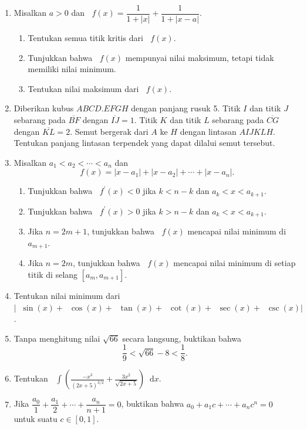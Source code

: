 \documentclass[12pt]{article}
\newcommand*\diff{\mathop{}\!\mathrm{d}}
\newcommand*\func[2]{\mathop{}\!{#1}{\left({#2}\right)}}
\newcommand*\ds[1]{\mathop{}\!\displaystyle{{#1}}}
\begin{document}
\begin{enumerate}[leftmargin=*]
\begin{enumerate}
		\end{enumerate}
		\item Misalkan $ a > 0 $ dan $ \func{f}{x} = \dfrac{1}{1 + \left|x\right|} + \dfrac{1}{1 + \left|x - a\right|} $.
		\begin{enumerate}
			\item Tentukan semua titik kritis dari $ \func{f}{x} $.
			\item Tunjukkan bahwa $ \func{f}{x} $ mempunyai nilai maksimum, tetapi tidak memiliki nilai minimum.
			\item Tentukan nilai maksimum dari $ \func{f}{x} $.
		\end{enumerate}
		\item Diberikan kubus $ ABCD.EFGH $ dengan panjang rusuk 5. Titik $ I $ dan titik $ J $ sebarang pada $ \overline{BF} $ dengan $ \overline{IJ} = 1 $. Titik $ K $ dan titik $ L $ sebarang pada $ \overline{CG} $ dengan $ \overline{KL} = 2 $. Semut bergerak dari $ A $ ke $ H $ dengan lintasan $ AIJKLH $. Tentukan panjang lintasan terpendek yang dapat dilalui semut tersebut.
		\item Misalkan $ a_{1} < a_{2} < \cdots < a_{n} $ dan
		\[ \func{f}{x} = \left|x - a_{1}\right| + \left|x - a_{2}\right| + \cdots + \left|x - a_{n}\right|. \]
		\begin{enumerate}
			\item Tunjukkan bahwa $ \func{f^{\prime}}{x} < 0 $ jika $ k < n - k $ dan $ a_{k} < x < a_{k + 1} $.
			\item Tunjukkan bahwa $ \func{f^{\prime}}{x} > 0 $ jika $ k > n - k $ dan $ a_{k} < x < a_{k + 1} $.
			\item Jika $ n = 2m + 1 $, tunjukkan bahwa $ \func{f}{x} $ mencapai nilai minimum di $ a_{m + 1} $.
			\item Jika $ n = 2m $, tunjukkan bahwa $ \func{f}{x} $ mencapai nilai minimum di setiap titik di selang $ \left[a_{m}, a_{m + 1}\right] $.
		\end{enumerate}
		\item Tentukan nilai minimum dari $ \left|\func{\sin}{x} + \func{\cos}{x} + \func{\tan}{x} + \func{\cot}{x} + \func{\sec}{x} + \func{\csc}{x}\right| $.
		\item Tanpa menghitung nilai $ \sqrt{66} $ secara langsung, buktikan bahwa
		\[ \frac{1}{9} < \sqrt{66} - 8 < \frac{1}{8}. \]
		\item Tentukan $ \ds{\int{\left(\frac{-x^{3}}{\left(2x + 5\right)^{3/2}} + \frac{3x^{2}}{\sqrt{2x + 5}}\right) \diff{x}}} $.
		\item Jika $ \dfrac{a_{0}}{1} + \dfrac{a_{1}}{2} + \cdots + \dfrac{a_{n}}{n + 1} = 0 $, buktikan bahwa $ a_{0} + a_{1}c + \cdots + a_{n}c^{n} = 0 $ untuk suatu $ c \in \left[0, 1\right] $.

\end{enumerate}
\end{document}
